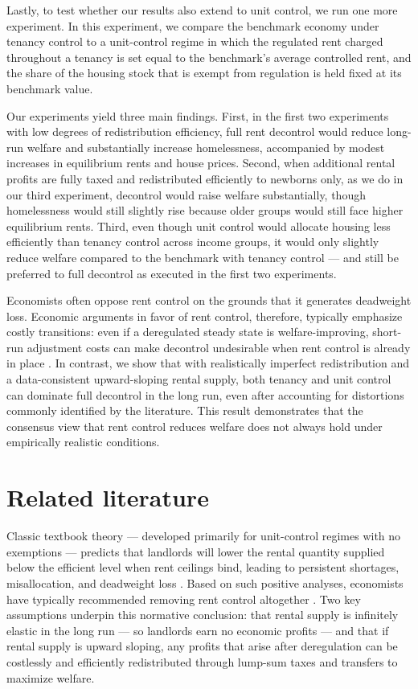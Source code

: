 \documentclass[parskip=full]{article}
\begin{document}
Lastly, to test whether our results also extend to unit control, we run one more experiment. In this experiment, we compare the benchmark economy under tenancy control to a unit-control regime in which the regulated rent charged throughout a tenancy is set equal to the benchmark’s average controlled rent, and the share of the housing stock that is exempt from regulation is held fixed at its benchmark value.

Our experiments yield three main findings. First, in the first two experiments with low degrees of redistribution efficiency, full rent decontrol would reduce long-run welfare and substantially increase homelessness, accompanied by modest increases in equilibrium rents and house prices. Second, when additional rental profits are fully taxed and redistributed efficiently to newborns only, as we do in our third experiment, decontrol would raise welfare substantially, though homelessness would still slightly rise because older groups would still face higher equilibrium rents. Third, even though unit control would allocate housing less efficiently than tenancy control across income groups, it would only slightly reduce welfare compared to the benchmark with tenancy control — and still be preferred to full decontrol as executed in the first two experiments. 

Economists often oppose rent control on the grounds that it generates deadweight loss. Economic arguments in favor of rent control, therefore, typically emphasize costly transitions: even if a deregulated steady state is welfare-improving, short-run adjustment costs can make decontrol undesirable when rent control is already in place \citep{fmn-2023}. In contrast, we show that with realistically imperfect redistribution and a data-consistent upward-sloping rental supply, both tenancy and unit control can dominate full decontrol in the long run, even after accounting for distortions commonly identified by the literature. This result demonstrates that the consensus view that rent control reduces welfare does not always hold under empirically realistic conditions.

\section{Related literature}\label{sec:related_lit}

Classic textbook theory — developed primarily for unit-control regimes with no exemptions — predicts that landlords will lower the rental quantity supplied below the efficient level when rent ceilings bind, leading to persistent shortages, misallocation, and deadweight loss \citep{suen-1989,gl-2003,diamond-2019}. Based on such positive analyses, economists have typically recommended removing rent control altogether \citep{lindbeck1971,buchanan_1986,friedman_stigler_1946}. Two key assumptions underpin this normative conclusion: that rental supply is infinitely elastic in the long run — so landlords earn no economic profits — and that if rental supply is upward sloping, any profits that arise after deregulation can be costlessly and efficiently redistributed through lump-sum taxes and transfers to maximize welfare.
\end{document}
